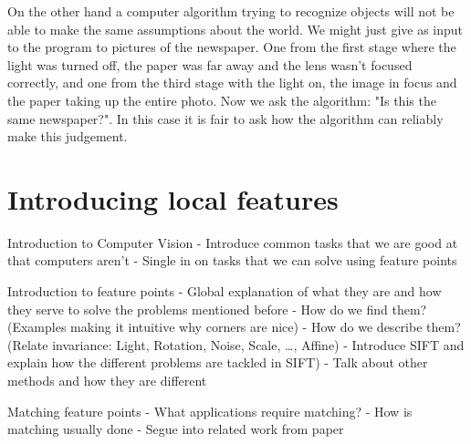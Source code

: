 On the other hand a computer algorithm trying to recognize objects will 
not be able to make the same assumptions about the world. We might just 
give as input to the program to pictures of the newspaper. One from the 
first stage where the light was turned off, the paper was far away and 
the lens wasn't focused correctly, and one from the third stage with the 
light on, the image in focus and the paper taking up the entire photo.  
Now we ask the algorithm: "Is this the same newspaper?". In this case it 
is fair to ask how the algorithm can reliably make this judgement.

\section{Introducing local features}



Introduction to Computer Vision
 - Introduce common tasks that we are good at that computers aren't
 - Single in on tasks that we can solve using feature points

Introduction to feature points
 - Global explanation of what they are and how they serve to solve the 
problems mentioned before
 - How do we find them? (Examples making it intuitive why corners are 
nice)
 - How do we describe them? (Relate invariance: Light, Rotation, Noise, 
 Scale, \ldots, Affine)
 - Introduce SIFT and explain how the different problems are tackled in 
SIFT)
 - Talk about other methods and how they are different

Matching feature points
 - What applications require matching?
 - How is matching usually done
 - Segue into related work from paper
